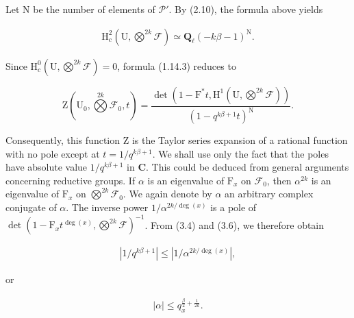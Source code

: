 \documentclass[10pt,leqno]{article}
\begin{document}
\noindent Let \(\mathrm{N}\) be the number of elements of \(\mathcal{P} '\). By (2.10), the formula above yields\par

\begin{equation*}\begin{gathered}\mathrm{H}_{c}^{2}(\mathrm{U},\bigotimes\limits^{2k}\mathcal{F} ) \simeq  \mathbf{Q}_{\ell }(- k\beta - 1)^{\mathrm{N}}.\end{gathered}\end{equation*}

\noindent Since \(\mathrm{H}_{c}^{0}(\mathrm{U},\bigotimes\limits^{2k}\mathcal{F} )=0\), formula (1.14.3) reduces to\par

\[\mathrm{Z}(\mathrm{U}_{0},\bigotimes\limits^{2k}\mathcal{F} _{0},t)=\frac{\operatorname{det}(1- \mathrm{F}^{*}t,\mathrm{H}^{1}(\mathrm{U},\bigotimes\limits^{2k}\mathcal{F} ))}{(1- q^{k\beta +1}t)^{\mathrm{N}}}.\]

\noindent Consequently, this function \(\mathrm{Z}\) is the Taylor series expansion of a rational function with no pole except at \(t=1/q^{k\beta +1}\). We shall use only the fact that the poles have absolute value \(1/q^{k\beta +1}\) in \(\mathbf{C}\). This could be deduced from general arguments concerning reductive groups. If \(\alpha \) is an eigenvalue of \(\mathrm{F}_{x}\) on \(\mathcal{F} _{0}\), then \(\alpha ^{2k}\) is an eigenvalue of \(\mathrm{F}_{x}\) on \(\bigotimes\limits^{2k}\mathcal{F} _{0}\). We again denote by \(\alpha \) an arbitrary complex conjugate of \(\alpha \). The inverse power \(1/\alpha ^{2k/\operatorname{deg}(x)}\) is a pole of \(\operatorname{det}(1- \mathrm{F}_{x} t^{\operatorname{deg}(x)},\bigotimes\limits^{2k}\mathcal{F} )^{- 1}\). From (3.4) and (3.6), we therefore obtain\par

\begin{equation*}\begin{gathered}|1/q^{k\beta +1}| \leq  |1/\alpha ^{2k/\operatorname{deg}(x)}|,\end{gathered}\end{equation*}

\noindent or\par

\begin{equation*}\begin{gathered}|\alpha | \leq  q_{x}^{\frac{\beta}{2}+\frac{1}{2k}}.\end{gathered}\end{equation*}
\end{document}
